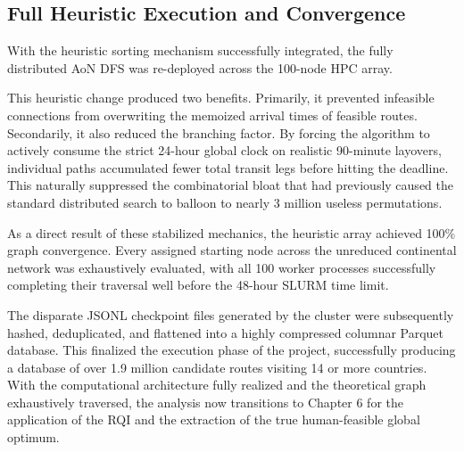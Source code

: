 \subsection{Full Heuristic Execution and Convergence}
\label{subsec:full_heuristic_execution_convergence}

With the heuristic sorting mechanism successfully integrated, the fully distributed AoN DFS was re-deployed across the 100-node HPC array.

\medskip

This heuristic change produced two benefits. Primarily, it prevented infeasible connections from overwriting the memoized arrival times of feasible routes. Secondarily, it also reduced the branching factor. By forcing the algorithm to actively consume the strict 24-hour global clock on realistic 90-minute layovers, individual paths accumulated fewer total transit legs before hitting the deadline. This naturally suppressed the combinatorial bloat that had previously caused the standard distributed search to balloon to nearly 3 million useless permutations.

\medskip

As a direct result of these stabilized mechanics, the heuristic array achieved 100\% graph convergence. Every assigned starting node across the unreduced continental network was exhaustively evaluated, with all 100 worker processes successfully completing their traversal well before the 48-hour SLURM time limit.

\medskip

The disparate JSONL checkpoint files generated by the cluster were subsequently hashed, deduplicated, and flattened into a highly compressed columnar Parquet database. This finalized the execution phase of the project, successfully producing a database of over 1.9 million candidate routes visiting 14 or more countries. With the computational architecture fully realized and the theoretical graph exhaustively traversed, the analysis now transitions to Chapter 6 for the application of the RQI and the extraction of the true human-feasible global optimum.
